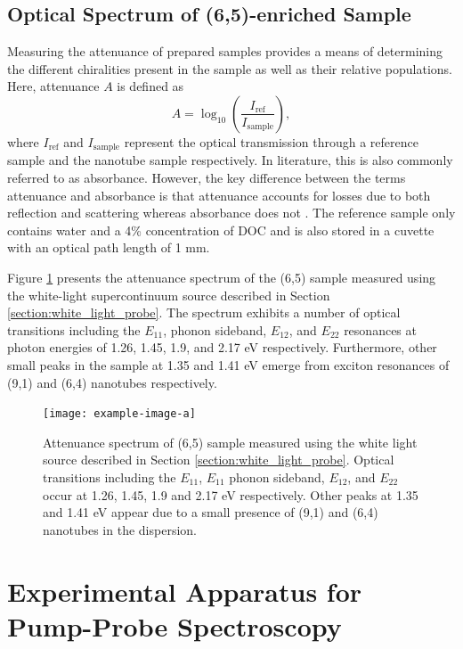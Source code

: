 \subsection{Optical Spectrum of (6,5)-enriched Sample}

Measuring the attenuance of prepared samples provides a means of determining the different chiralities present in the sample as well as their relative populations. Here, attenuance $A$ is defined as
\begin{equation}
A = \log_{10}\left(\dfrac{I_{\mathrm{ref}}}{I_{\mathrm{sample}}}\right),
\end{equation}
where $I_{\mathrm{ref}}$ and $I_{\mathrm{sample}}$ represent the optical transmission through a reference sample and the nanotube sample respectively. In literature, this is also commonly referred to as absorbance. However, the key difference between the terms attenuance and absorbance is that attenuance accounts for losses due to both reflection and scattering whereas absorbance does not \cite{dixon1992absorbance}. The reference sample only contains water and a 4\% concentration of DOC and is also stored in a cuvette with an optical path length of 1 mm.

Figure \ref{fig:sample_absorbance} presents the attenuance spectrum of the (6,5) sample measured using the white-light supercontinuum source described in Section \ref{section:white_light_probe}. The spectrum exhibits a number of optical transitions including the $E_{11}$, phonon sideband, $E_{12}$, and $E_{22}$ resonances at photon energies of 1.26, 1.45, 1.9, and 2.17 eV respectively. Furthermore, other small peaks in the sample at 1.35 and 1.41 eV emerge from exciton resonances of (9,1) and (6,4) nanotubes respectively.

\begin{figure}[H]
	\centering
	\texttt{[image: example-image-a]}
	\caption{ Attenuance spectrum of (6,5) sample measured using the white light source described in Section \ref{section:white_light_probe}. Optical transitions including the $E_{11}$, $E_{11} $ phonon sideband, $E_{12}$, and $E_{22}$ occur at 1.26, 1.45, 1.9 and 2.17 eV respectively. Other peaks at 1.35 and 1.41 eV appear due to a small presence of (9,1) and (6,4) nanotubes in the dispersion.}
	\label{fig:sample_absorbance}
\end{figure}

\section{Experimental Apparatus for Pump-Probe Spectroscopy}

